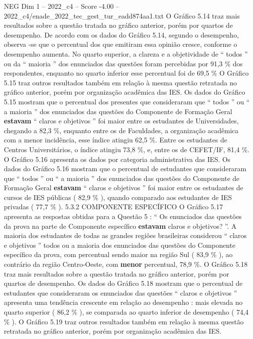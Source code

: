 \begin{textsample}{NEG Dim 1 – 2022\_c4 – Score -4.00 – 2022\_c4/enade\_2022\_tec\_gest\_tur\_eadd874aa1.txt}
O Gráfico 5.14 traz mais resultados sobre a questão tratada no gráfico anterior, porém por quartos de desempenho.
De acordo com os dados do Gráfico 5.14, segundo o desempenho, observa -se que o percentual dos que emitiram essa opinião cresce, conforme o desempenho aumenta.
No quarto superior, a clareza e a objetividade de “ todos ” ou da “ maioria ” dos enunciados das questões foram percebidas por 91,3 \% dos respondentes, enquanto no quarto inferior esse percentual foi de 69,5 \% O Gráfico 5.15 traz outros resultados também em relação à mesma questão retratada no gráfico anterior, porém por organização acadêmica das IES.
Os dados do Gráfico 5.15 mostram que o percentual dos presentes que consideraram que “ todos ” ou “ a maioria ” dos enunciados das questões do Componente de Formação Geral \textbf{estavam} “ claros e objetivos ” foi maior entre os estudantes de Universidades, chegando a 82,3 \%, enquanto entre os de Faculdades, a organização acadêmica com a menor incidência, esse índice atingiu 62,5 \%.
Entre os estudantes de Centros Universitários, o índice atingiu 73,8 \%, e, entre os de CEFET/IF, 81,4 \%.
O Gráfico 5.16 apresenta os dados por categoria administrativa das IES.
Os dados do Gráfico 5.16 mostram que o percentual de estudantes que consideraram que “ todos ” ou “ a maioria ” dos enunciados das questões do Componente de Formação Geral \textbf{estavam} “ claros e objetivos ” foi maior entre os estudantes de cursos de IES públicas ( 82,9 \% ), quando comparado aos estudantes de IES privadas ( 77,7 \% ). 5.3.2 COMPONENTE ESPECÍFICO O Gráfico 5.17 apresenta as respostas obtidas para a Questão 5 : “ Os enunciados das questões da prova na parte de Componente específico \textbf{estavam} claros e objetivos? ”.
A maioria dos estudantes de todas as grandes regiões brasileiras considerou “ claros e objetivos ” todos ou a maioria dos enunciados das questões do Componente específico da prova, com percentual sendo maior na região Sul ( 83,9 \% ), ao contrário da região Centro-Oeste, com \textbf{menor} percentual, 78,9 \%.
O Gráfico 5.18 traz mais resultados sobre a questão tratada no gráfico anterior, porém por quartos de desempenho.
Os dados do Gráfico 5.18 mostram que o percentual de estudantes que consideraram os enunciados das questões “ claros e objetivos ” apresenta uma tendência crescente em relação ao desempenho : mais elevada no quarto superior ( 86,2 \% ), se comparada ao quarto inferior de desempenho ( 74,4 \% ).
O Gráfico 5.19 traz outros resultados também em relação à mesma questão retratada no gráfico anterior, porém por organização acadêmica das IES.

\end{textsample}
